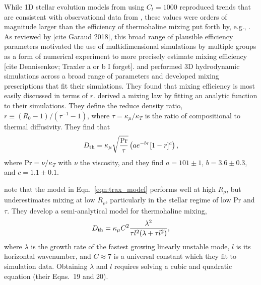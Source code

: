While 1D stellar evolution models from \citet{charbonnel_thermohaline_2007} using $C_t = 1000$ \citep[consistent with the efficiency argued by][]{ulrich_1972} reproduced trends that are consistent with observational data from \citet{Gratton2000}, these values were orders of magnitude larger than the efficiency of thermohaline mixing put forth by, e.g., \citet{kippenhahn_etal_1980}. 
As reviewed by [cite Garaud 2018], this broad range of plausible efficiency parameters motivated the use of multidimensional simulations by multiple groups as a form of numerical experiment to more precisely estimate mixing efficiency [cite Dennisenkov; Traxler a or b I forget]. 
\citet{traxler_etal_2011} and \citet{brown_etal_2013} performed 3D hydrodynamic simulations across a broad range of parameters and developed mixing prescriptions that fit their simulations. 
They found that mixing efficiency is most easily discussed in terms of $r$.
\citet{traxler_etal_2011} derived a mixing law by fitting an analytic function to their simulations.
They define the reduce density ratio, $r \equiv (R_0 - 1)/(\tau^{-1} - 1)$, where $\tau = \kappa_\mu/\kappa_T$ is the ratio of compositional to thermal diffusivity.
They find that
\begin{equation} \label{eqn:trax_model}
   \Dth = \kappa_{\mu}\sqrt{\frac{\mathrm{Pr}}{\tau}}\left(a e^{-br}[1 - r]^c\right),
\end{equation}
where $\mathrm{Pr} = \nu / \kappa_T$ with $\nu$ the viscosity, and they find $a = 101 \pm 1$, $b = 3.6 \pm 0.3$, and $c = 1.1 \pm 0.1$.



\citet{brown_etal_2013} note that the model in Eqn.~\ref{eqn:trax_model} performs well at high $R_\rho$, but underestimates mixing at low $R_\rho$, particularly in the stellar regime of low Pr and $\tau$.
They develop a semi-analytical model for thermohaline mixing,
\begin{equation}
    \Dth = \kappa_{\mu}C^2\frac{\lambda^2}{\tau l^2(\lambda + \tau l^2)},
    \label{eqn:brown_model}
\end{equation}
where $\lambda$ is the growth rate of the fastest growing linearly unstable mode, $l$ is its horizontal wavenumber, and $C \approx 7$ is a universal constant which they fit to simulation data.
Obtaining $\lambda$ and $l$ requires solving a cubic and quadratic equation (their Eqns.~19 and 20).

